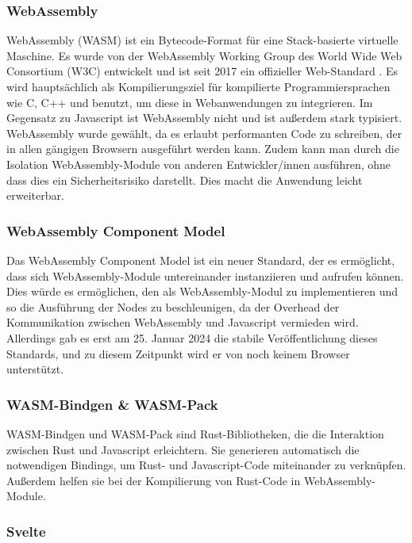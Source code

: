 \documentclass[ngerman]{article}
\begin{document}
\subsubsection{WebAssembly}
WebAssembly (WASM) ist ein Bytecode-Format für eine Stack-basierte virtuelle Maschine. Es wurde von der WebAssembly Working Group des World Wide Web Consortium (W3C) entwickelt und ist seit 2017 ein offizieller Web-Standard \cite{Haas2017}. 
\br
Es wird hauptsächlich als Kompilierungsziel für kompilierte Programmiersprachen wie C, C++ und  benutzt, um diese in Webanwendungen zu integrieren. Im Gegensatz zu Javascript ist WebAssembly nicht  und ist außerdem stark typisiert.
\br
WebAssembly wurde gewählt, da es erlaubt performanten Code zu schreiben, der in allen gängigen Browsern ausgeführt werden kann. 
Zudem kann man durch die Isolation WebAssembly-Module von anderen Entwickler/innen ausführen, ohne dass dies ein Sicherheitsrisiko darstellt. Dies macht die Anwendung leicht erweiterbar.

\subsubsection*{WebAssembly Component Model}
Das WebAssembly Component Model ist ein neuer Standard, der es ermöglicht, dass sich WebAssembly-Module untereinander instanziieren und aufrufen können. \cite{bytecodeallianceIntroductionWebAssembly} 
Dies würde es ermöglichen, den  als WebAssembly-Modul zu implementieren und so die Ausführung der Nodes zu beschleunigen, da der Overhead der Kommunikation zwischen WebAssembly und Javascript vermieden wird. Allerdings gab es erst am 25. Januar 2024 die stabile Veröffentlichung dieses Standards, und zu diesem Zeitpunkt wird er von noch keinem Browser unterstützt.

\subsubsection{WASM-Bindgen \& WASM-Pack}
\label{sec:WASM-Bindgen}

WASM-Bindgen und WASM-Pack sind Rust-Bibliotheken, die die Interaktion zwischen Rust und Javascript erleichtern. Sie generieren automatisch die notwendigen Bindings, um Rust- und Javascript-Code miteinander zu verknüpfen. Außerdem helfen sie bei der Kompilierung von Rust-Code in WebAssembly-Module. 
\cite{rustwasmIntroductionwasmbindgen}

\subsubsection{Svelte}
\label{sec:Svelte}
\end{document}
